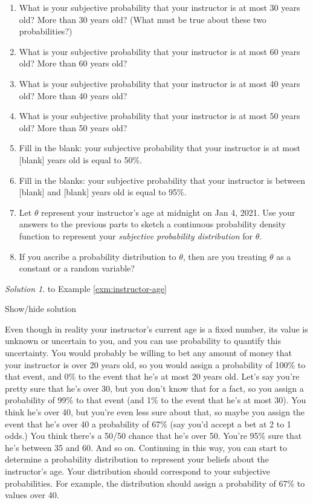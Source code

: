 \documentclass[
]{book}
\providecommand{\tightlist}{%
  \setlength{\itemsep}{0pt}\setlength{\parskip}{0pt}}
\theoremstyle{definition}
\theoremstyle{definition}
\theoremstyle{definition}
\theoremstyle{remark}
\newtheorem*{solution}{Solution}
\begin{document}
\begin{enumerate}
\def\labelenumi{\arabic{enumi}.}
\tightlist
\item
  What is your subjective probability that your instructor is at most 30 years old? More than 30 years old? (What must be true about these two probabilities?)
\item
  What is your subjective probability that your instructor is at most 60 years old? More than 60 years old?
\item
  What is your subjective probability that your instructor is at most 40 years old? More than 40 years old?
\item
  What is your subjective probability that your instructor is at most 50 years old? More than 50 years old?
\item
  Fill in the blank: your subjective probability that your instructor is at most {[}blank{]} years old is equal to 50\%.
\item
  Fill in the blanks: your subjective probability that your instructor is between {[}blank{]} and {[}blank{]} years old is equal to 95\%.
\item
  Let \(\theta\) represent your instructor's age at midnight on Jan 4, 2021. Use your answers to the previous parts to sketch a
  continuous probability density function to represent your
  \emph{subjective probability distribution} for \(\theta\).
\item
  If you ascribe a probability distribution to \(\theta\), then are you treating \(\theta\) as a constant or a random variable?
\end{enumerate}

\begin{solution}
{}
to Example \ref{exm:instructor-age}
\end{solution}

Show/hide solution

Even though in reality your instructor's current age is a fixed number, its value is unknown or uncertain to you, and you can use probability to quantify this uncertainty. You would probably be willing to bet any amount of money that your instructor is over 20 years old, so you would assign a probability of 100\% to that event, and 0\% to the event that he's at most 20 years old. Let's say you're pretty sure that he's over 30, but you don't know that for a fact, so you assign a probability of 99\% to that event (and 1\% to the event that he's at most 30). You think he's over 40, but you're even less sure about that, so maybe you assign the event that he's over 40 a probability of 67\% (say you'd accept a bet at 2 to 1 odds.) You think there's a 50/50 chance that he's over 50. You're 95\% sure that he's between 35 and 60. And so on. Continuing in this way, you can start to determine a probability distribution to represent your beliefs about the instructor's age. Your distribution should correspond to your subjective probabilities. For example, the distribution should assign a probability of 67\% to values over 40.
\end{document}
